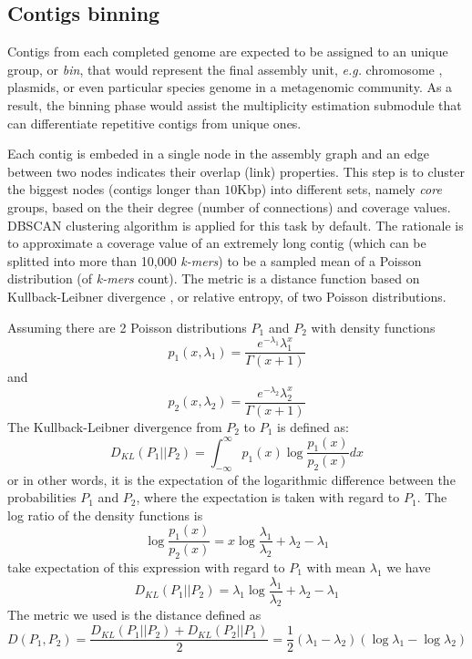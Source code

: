 \documentclass[10pt,twocolumn,twoside]{genpaper}
\newcommand{\EG}{\emph{e.g.}}
\begin{document}
\subsection*{Contigs binning}
Contigs from each completed genome are expected to be assigned to an unique group, or \emph{bin}, that would represent the final assembly unit, \EG{} chromosome , plasmids, or even particular species genome in a metagenomic community. As a result, the binning phase would assist the multiplicity estimation submodule that can differentiate repetitive contigs from unique ones. 

Each contig is embeded in a single node in the assembly graph and an edge between two nodes indicates their overlap (link) properties.
This step is to cluster the biggest nodes (contigs longer than $10$Kbp) into different sets, namely \emph{core} groups, based on the their degree (number of connections) and coverage values.
DBSCAN clustering algorithm \cite{Ester96adensity-based} is applied for this task by default.
The rationale is to approximate a coverage value of an extremely long contig (which can be splitted into more than 10,000 \emph{k-mers}) to be a sampled mean of a Poisson distribution (of \emph{k-mers} count). 
The metric is a distance function based on Kullback-Leibner divergence \cite{Kullback1951information}, or relative entropy, of two Poisson distributions. 

Assuming there are 2 Poisson distributions $P_1$ and $P_2$ with density functions $$p_1(x,\lambda_1)=\frac{e^{-\lambda_1}\lambda_1^x}{\Gamma(x+1)}$$ and $$p_2(x,\lambda_2)=\frac{e^{-\lambda_2}\lambda_2^x}{\Gamma(x+1)}$$ 
The Kullback-Leibner divergence from $P_2$ to $P_1$ is defined as:
$$D_{KL}(P_1||P_2)=\int_{-\infty}^{\infty} p_1(x)\log{\frac{p_1(x)}{p_2(x)}} dx$$
or in other words,  it is the expectation of the logarithmic difference between the probabilities $P_1$ and $P_2$, where the expectation is taken with regard to $P_1$.
The log ratio of the density functions is
$$\log{\frac{p_1(x)}{p_2(x)}}=x\log{\frac{\lambda_1}{\lambda_2}}+\lambda_2-\lambda_1$$
take expectation of this expression with regard to $P_1$ with mean $\lambda_1$ we have
$$D_{KL}(P_1||P_2)=\lambda_1\log{\frac{\lambda_1}{\lambda_2}}+\lambda_2-\lambda_1$$
The metric we used is the distance defined as
$$D(P_1,P_2)=\frac{D_{KL}(P_1||P_2)+D_{KL}(P_2||P_1)}{2}=\frac{1}{2}(\lambda_1-\lambda_2)(\log{\lambda_1}-\log{\lambda_2})$$
\end{document}
